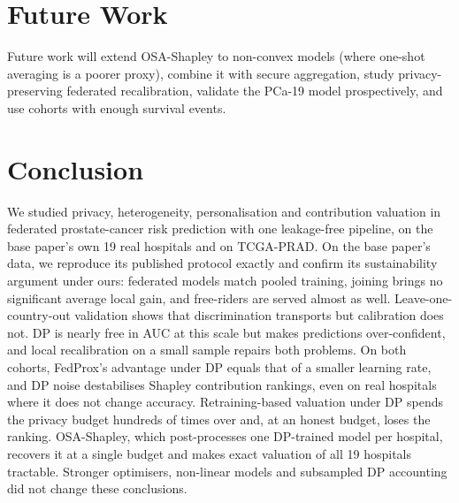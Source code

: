 \documentclass[journal]{IEEEtran}
\begin{document}
\section{Future Work}
Future work will extend OSA-Shapley to non-convex models (where one-shot averaging is a poorer proxy), combine it with secure aggregation, study privacy-preserving federated recalibration, validate the PCa-19 model prospectively, and use cohorts with enough survival events.

\section{Conclusion}
We studied privacy, heterogeneity, personalisation and contribution valuation in federated prostate-cancer risk prediction with one leakage-free pipeline, on the base paper's own 19 real hospitals and on TCGA-PRAD. On the base paper's data, we reproduce its published protocol exactly and confirm its sustainability argument under ours: federated models match pooled training, joining brings no significant average local gain, and free-riders are served almost as well. Leave-one-country-out validation shows that discrimination transports but calibration does not. DP is nearly free in AUC at this scale but makes predictions over-confident, and local recalibration on a small sample repairs both problems. On both cohorts, FedProx's advantage under DP equals that of a smaller learning rate, and DP noise destabilises Shapley contribution rankings, even on real hospitals where it does not change accuracy. Retraining-based valuation under DP spends the privacy budget hundreds of times over and, at an honest budget, loses the ranking. OSA-Shapley, which post-processes one DP-trained model per hospital, recovers it at a single budget and makes exact valuation of all 19 hospitals tractable. Stronger optimisers, non-linear models and subsampled DP accounting did not change these conclusions.



\end{document}
